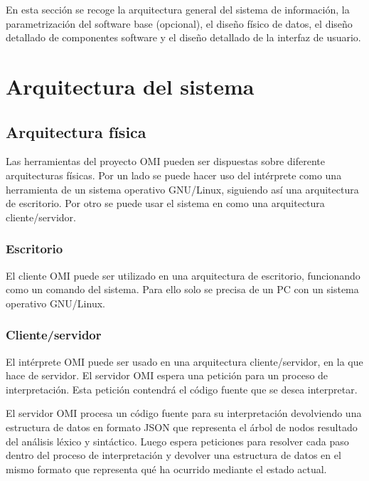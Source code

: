 

En esta sección se recoge la arquitectura general del sistema de información, la parametrización del software base (opcional), el diseño físico de datos, el diseño detallado de componentes software y el diseño detallado de la interfaz de usuario.

\section{Arquitectura del sistema}
\subsection {Arquitectura física}
Las herramientas del proyecto OMI pueden ser dispuestas sobre diferente arquitecturas físicas. Por un lado se puede hacer uso 
del intérprete como una herramienta de un sistema operativo GNU/Linux, siguiendo así una arquitectura de escritorio. 
Por otro se puede usar el sistema en como una arquitectura cliente/servidor.

\subsubsection{Escritorio}
El cliente OMI puede ser utilizado en una arquitectura de escritorio, funcionando como un comando del sistema. Para ello solo se precisa de un PC con un sistema operativo GNU/Linux.

\subsubsection{Cliente/servidor}
El intérprete OMI puede ser usado en una arquitectura cliente/servidor, en la que hace de servidor. El servidor OMI espera una petición para un proceso de interpretación. Esta petición
contendrá el código fuente que se desea interpretar.

El servidor OMI procesa un código fuente para su interpretación devolviendo una estructura de datos en formato JSON que representa el árbol de nodos resultado del análisis léxico y sintáctico. 
Luego espera peticiones para resolver cada paso dentro del proceso de interpretación y devolver una estructura de datos en el mismo formato que representa qué ha ocurrido mediante el estado actual.

